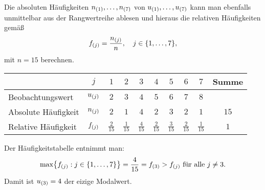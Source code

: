 \documentclass{exercise}
\begin{document}
\begin{enumerate}
        Die absoluten Häufigkeiten \(n_{\parentheses*{1}}, \ldots, n_{\parentheses*{7}}\) von \(u_{\parentheses*{1}}, \ldots, u_{\parentheses*{7}}\) kann man ebenfalls unmittelbar aus der Rangwertreihe ablesen und hieraus die relativen Häufigkeiten gemäß
        \[
            f_{\parentheses*{j}} = \frac{n_{\parentheses*{j}}}{n}, \quad j \in \braces*{1, \ldots, 7},
        \]
        mit \(n = 15\) berechnen.
        \begin{center}
            \begin{tabular}{lccccccccc}
                \toprule
                & \(j\) & \(1\) & \(2\) & \(3\) & \(4\) & \(5\) & \(6\) & \(7\) & Summe\\
                \midrule
                Beobachtungswert & \(u_{\parentheses*{j}}\) & \(2\) & \(3\) & \(4\) & \(5\) & \(6\) & \(7\) & \(8\) &\\
                Absolute Häufigkeit & \(n_{\parentheses*{j}}\) & \(2\) & \(1\) & \(4\) & \(2\) & \(3\) & \(2\) & \(1\) & \(15\)\\
                Relative Häufigkeit & \(f_{\parentheses*{j}}\) & \(\frac{2}{15}\) & \(\frac{1}{15}\) & \(\frac{4}{15}\) & \(\frac{2}{15}\) & \(\frac{3}{15}\) & \(\frac{2}{15}\) & \(\frac{1}{15}\) & \(1\)\\
                \bottomrule
            \end{tabular}
        \end{center}
        Der Häufigkeitstabelle entnimmt man:
        \[
            \max\braces*{f_{\parentheses*{j}} : j \in \braces*{1, \ldots, 7}} = \frac{4}{15} = f_{\parentheses*{3}} > f_{\parentheses*{j}}\text{ für alle }j \ne 3.
        \]
        Damit ist \(u_{\parentheses*{3}} = 4\) der eizige Modalwert.
    \end{enumerate}
\end{document}
